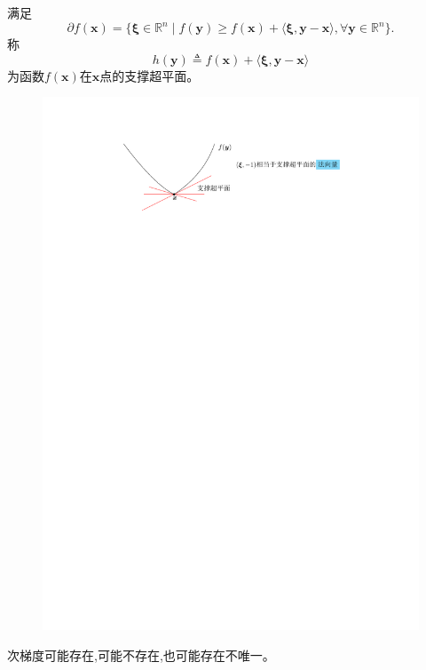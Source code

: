 \begin{definition}[次微分]
    满足
    \[
        \partial f(\boldsymbol{x})=\{\boldsymbol{\xi}\in\mathbb{R}^n\mid f(\boldsymbol{y})\geqslant f(\boldsymbol{x})+\langle\boldsymbol{\xi},\boldsymbol{y}-\boldsymbol{x}\rangle,\forall\boldsymbol{y}\in\mathbb{R}^n\}.
    \]
    称
    \[
        h(\boldsymbol{y})\triangleq f(\boldsymbol{x})+\langle\boldsymbol{\xi},\boldsymbol{y}-\boldsymbol{x}\rangle 
    \]
    为函数$f(\boldsymbol{x})$在$\boldsymbol{x}$点的支撑超平面。
    \begin{figure}[htbp]
        \centering
        \includegraphics{image/支撑超平面.pdf}
    \end{figure}
\end{definition}
\begin{note}
    次梯度可能存在,可能不存在,也可能存在不唯一。
\end{note}
